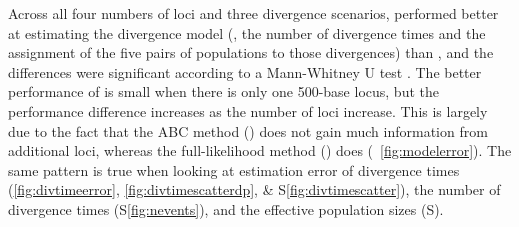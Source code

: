 \documentclass[letterpaper,12pt]{article}
\begin{document}
Across all four numbers of loci and three divergence scenarios, \ecoevolity
performed better at estimating the divergence model (\ie, the number of
divergence times and the assignment of the five pairs of populations to those
divergences) than \dppmsbayes, and the differences were significant according
to a Mann-Whitney U test \citep[\fig~\ref{fig:modelerror};][]{MannWhitney1947}.
The better performance of \ecoevolity is small when there is only one 500-base
locus, but the performance difference increases as the number of loci increase.
This is largely due to the fact that the ABC method (\dppmsbayes) does not gain
much information from additional loci, whereas the full-likelihood method
(\ecoevolity) does (\fig~\ref{fig:modelerror}).
The same pattern is true when looking at estimation error of divergence times
(\figs \ref{fig:divtimeerror}, \ref{fig:divtimescatterdp}, \& S\ref{fig:divtimescatter}),
the number of divergence times
(\fig S\ref{fig:nevents}),
and the effective population sizes 
(\figs S).
\end{document}
